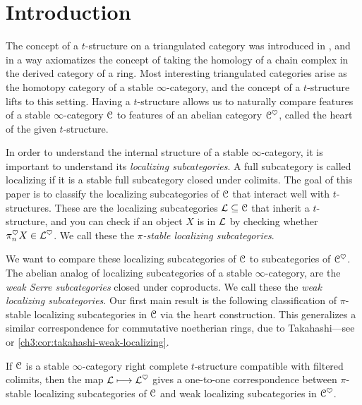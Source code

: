 

\section{Introduction}

The concept of a $t$-structure on a triangulated category was introduced in \cite{beilinson-bernstein-deligne_1983}, and in a way axiomatizes the concept of taking the homology of a chain complex in the derived category of a ring. Most interesting triangulated categories arise as the homotopy category of a stable $\infty$-category, and the concept of a $t$-structure lifts to this setting. Having a $t$-structure allows us to naturally compare features of a stable $\infty$-category $\EuScript{C}$ to features of an abelian category $\EuScript{C}^\heartsuit$, called the heart of the given $t$-structure. 

In order to understand the internal structure of a stable $\infty$-category, it is important to understand its \emph{localizing subcategories}. A full subcategory is called localizing if it is a stable full subcategory closed under colimits. The goal of this paper is to classify the localizing subcategories of $\EuScript{C}$ that interact well with $t$-structures. These are the localizing subcategories $\mathcal{L}\subseteq \EuScript{C}$ that inherit a $t$-structure, and you can check if an object $X$ is in $\mathcal{L}$ by checking whether $\pi_n^\heartsuit X\in \mathcal{L}^\heartsuit$. We call these the \emph{$\pi$-stable localizing subcategories}.

We want to compare these localizing subcategories of $\EuScript{C}$ to subcategories of $\EuScript{C}^\heartsuit$. The abelian analog of localizing subcategories of a stable $\infty$-category, are the \emph{weak Serre subcategories} closed under coproducts. We call these the \emph{weak localizing subcategories}. Our first main result is the following classification of $\pi$-stable localizing subcategories in $\EuScript{C}$ via the heart construction. This generalizes a similar correspondence for commutative noetherian rings, due to Takahashi---see \cite{takahashi_2009} or \cref{ch3:cor:takahashi-weak-localizing}. 

\begin{introthm}
    \label{ch3:thm:A}
    If $\EuScript{C}$ is a stable $\infty$-category right complete $t$-structure compatible with filtered colimits, then the map $\mathcal{L}\longmapsto \mathcal{L}^\heartsuit$ gives a one-to-one correspondence between $\pi$-stable localizing subcategories of $\EuScript{C}$ and weak localizing subcategories in $\EuScript{C}^\heartsuit$.
\end{introthm}

